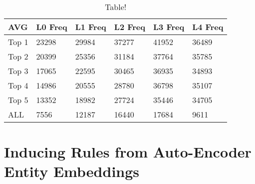 
	

\begin{table}[]
	\centering
	\begin{tabular}{llllll}
		AVG   & \textbf{L0 Freq} & \textbf{L1 Freq} & \textbf{L2 Freq} & \textbf{ L3 Freq} & \textbf{L4 Freq} \\
		\toprule
		Top 1 & 23298   & 29984   & 37277   & 41952   & 36489   \\
		Top 2 & 20399   & 25356   & 31184   & 37764   & 35785   \\
		Top 3 & 17065   & 22595   & 30465   & 36935   & 34893   \\
		Top 4 & 14986   & 20555   & 28780   & 36798   & 35107   \\
		Top 5 & 13352   & 18982   & 27724   & 35446   & 34705   \\
		ALL   & 7556    & 12187   & 16440   & 17684   & 9611   
	\end{tabular}
\caption{Table!}\label{quan-freq-table}
\end{table}









\section{Inducing Rules from Auto-Encoder Entity Embeddings}\label{InducingRulesFromEntityEmbeddings}


